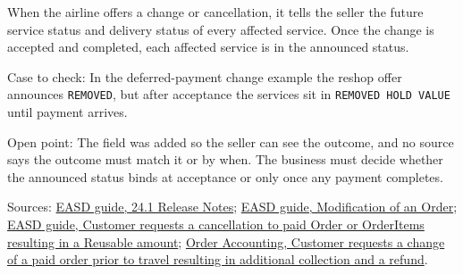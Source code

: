 \begin{theorem}
  \label{thm:delivery-future-status-announced}
  \notready
  When the airline offers a change or cancellation, it tells the seller the
  future service status and delivery status of every affected service. Once
  the change is accepted and completed, each affected service is in the
  announced status.

  Case to check: In the deferred-payment change example the reshop offer
  announces \texttt{REMOVED}, but after acceptance the services sit in
  \texttt{REMOVED HOLD VALUE} until payment arrives.

  Open point: The field was added so the seller can see the outcome, and no
  source says the outcome must match it or by when. The business must decide
  whether the announced status binds at acceptance or only once any payment
  completes.

  Sources: \href{https://standards.atlassian.net/wiki/spaces/EASD/pages/1404665857}{EASD guide, 24.1 Release Notes};
  \href{https://standards.atlassian.net/wiki/spaces/EASD/pages/574619782/Modification+of+an+Order}{EASD guide, Modification of an Order};
  \href{https://standards.atlassian.net/wiki/spaces/EASD/pages/817594921}{EASD guide, Customer requests a cancellation to paid Order or OrderItems resulting in a Reusable amount};
  \href{https://standards.atlassian.net/wiki/spaces/OA/pages/844202130}{Order Accounting, Customer requests a change of a paid order prior to travel resulting in additional collection and a refund}.
\end{theorem}

